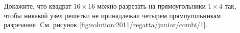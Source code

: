\problem
Докажите, что квадрат $16 \times 16$ можно разрезать на прямоугольники
$1 \times 4$ так, чтобы никакой узел решетки не принадлежал четырем
прямоугольникам разрезания.
%
\label{solution:2011/regatta/junior/combi/1}%
См. рисунок \ref{fig:solution:2011/regatta/junior/combi/1}.
\endproblem
